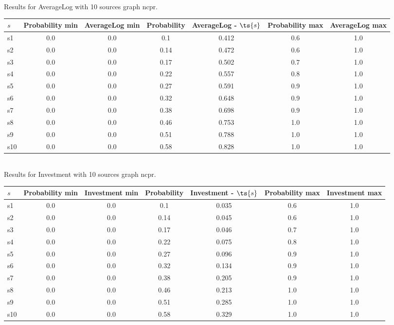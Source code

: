 \documentclass{article}
\begin{document}
\noindent Results for AverageLog with 10 sources graph ncpr.

\noindent\begin{tabular}{|l|c|c|c|c|c|c|}
\hline
$s$& Probability min & AverageLog min & Probability & AverageLog - $\ts{s}$ & Probability max & AverageLog max\\
\hline
s1 &0.0 & 0.0 & 0.1 & 0.412 & 0.6 & 1.0\\
\hline
s2 &0.0 & 0.0 & 0.14 & 0.472 & 0.6 & 1.0\\
\hline
s3 &0.0 & 0.0 & 0.17 & 0.502 & 0.7 & 1.0\\
\hline
s4 &0.0 & 0.0 & 0.22 & 0.557 & 0.8 & 1.0\\
\hline
s5 &0.0 & 0.0 & 0.27 & 0.591 & 0.9 & 1.0\\
\hline
s6 &0.0 & 0.0 & 0.32 & 0.648 & 0.9 & 1.0\\
\hline
s7 &0.0 & 0.0 & 0.38 & 0.698 & 0.9 & 1.0\\
\hline
s8 &0.0 & 0.0 & 0.46 & 0.753 & 1.0 & 1.0\\
\hline
s9 &0.0 & 0.0 & 0.51 & 0.788 & 1.0 & 1.0\\
\hline
s10 &0.0 & 0.0 & 0.58 & 0.828 & 1.0 & 1.0\\
\hline
\end{tabular}\\

\noindent Results for Investment with 10 sources graph ncpr.

\noindent\begin{tabular}{|l|c|c|c|c|c|c|}
\hline
$s$& Probability min & Investment min & Probability & Investment - $\ts{s}$ & Probability max & Investment max\\
\hline
s1 &0.0 & 0.0 & 0.1 & 0.035 & 0.6 & 1.0\\
\hline
s2 &0.0 & 0.0 & 0.14 & 0.045 & 0.6 & 1.0\\
\hline
s3 &0.0 & 0.0 & 0.17 & 0.046 & 0.7 & 1.0\\
\hline
s4 &0.0 & 0.0 & 0.22 & 0.075 & 0.8 & 1.0\\
\hline
s5 &0.0 & 0.0 & 0.27 & 0.096 & 0.9 & 1.0\\
\hline
s6 &0.0 & 0.0 & 0.32 & 0.134 & 0.9 & 1.0\\
\hline
s7 &0.0 & 0.0 & 0.38 & 0.205 & 0.9 & 1.0\\
\hline
s8 &0.0 & 0.0 & 0.46 & 0.213 & 1.0 & 1.0\\
\hline
s9 &0.0 & 0.0 & 0.51 & 0.285 & 1.0 & 1.0\\
\hline
s10 &0.0 & 0.0 & 0.58 & 0.329 & 1.0 & 1.0\\
\hline
\end{tabular}\\
\end{document}
